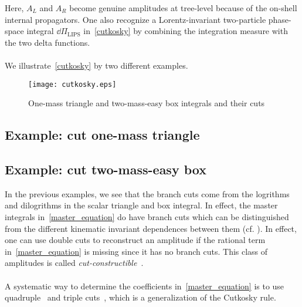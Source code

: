 Here, $A_L$ and $A_R$ become genuine amplitudes at tree-level because of the on-shell internal propagators. 
One also recognize a Lorentz-invariant two-particle phase-space integral $\dd\Pi_{\mathrm{LIPS}}$ in~\cref{cutkosky} by combining the integration measure with the two delta functions.
\\\\
We illustrate~\cref{cutkosky} by two different examples.
%
%
\begin{figure}[h]
  \centering
  \texttt{[image: cutkosky.eps]}
  \caption{One-mass triangle and two-mass-easy box integrals and their cuts}
  \label{fig-cutkosky}
\end{figure}
\subsection{Example: cut one-mass triangle}

\subsection{Example: cut two-mass-easy box}


%
In the previous examples, we see that the branch cuts come from the logrithms and dilogrithms in the scalar triangle and box integral. 
In effect, the master integrals in~\cref{master_equation} do have branch cuts which can be distinguished from the different kinematic invariant dependences between them (cf. \eg \cite{Bern:1993kr}).
In effect, one can use double cuts to reconstruct an amplitude if the rational term in~\cref{master_equation} is missing since it has no branch cuts.
This class of amplitudes is called \textit{cut-constructible}~\cite{Bern:1994cg}. 
\\\\
A systematic way to determine the coefficients in~\cref{master_equation} is to use quadruple~\cite{BRITTO2005499} and triple cuts~\cite{Forde:2007mi}, which is a generalization of the Cutkosky rule.